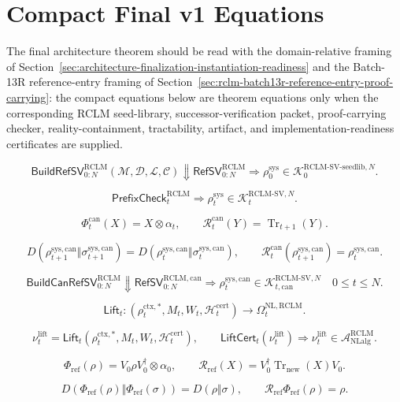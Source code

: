 \documentclass[11pt,a4paper]{article}
\newcommand{\Acal}{\mathcal A}
\newcommand{\Kcal}{\mathcal K}
\newcommand{\Tr}{\operatorname{Tr}}
\newcommand{\RCLM}{\mathrm{RCLM}}
\newcommand{\sys}{\mathrm{sys}}
\newcommand{\ctx}{\mathrm{ctx}}
\newcommand{\cert}{\mathrm{cert}}
\newcommand{\NL}{\mathrm{NL}}
\newcommand{\NLalg}{\mathrm{NLalg}}
\begin{document}
\section{Compact Final v1 Equations}

The final architecture theorem should be read with the domain-relative framing of Section~\ref{sec:architecture-finalization-instantiation-readiness} and the Batch-13R reference-entry framing of Section~\ref{sec:rclm-batch13r-reference-entry-proof-carrying}: the compact equations below are theorem equations only when the corresponding RCLM seed-library, successor-verification packet, proof-carrying checker, reality-containment, tractability, artifact, and implementation-readiness certificates are supplied.

\[
\mathsf{BuildRefSV}_{0:N}^{\RCLM}(\mathcal M,\mathcal D,\mathcal L,\mathcal C)
\Downarrow
\mathsf{RefSV}_{0:N}^{\RCLM}
\Longrightarrow
\rho_0^{\sys}
\in
\Kcal_0^{\RCLM\text{-}\mathrm{SV\mbox{-}seedlib},N}.
\]

\[
\mathsf{PrefixCheck}_t^{\RCLM}
\Longrightarrow
\rho_t^{\sys}
\in
\Kcal_t^{\RCLM\text{-}\mathrm{SV},N}.
\]

\[
\Phi_t^{\mathrm{can}}(X)=X\otimes\alpha_t,
\qquad
\mathcal R_t^{\mathrm{can}}(Y)=\Tr_{t+1}(Y).
\]

\[
D(\rho_{t+1}^{\sys,\mathrm{can}}\Vert\sigma_{t+1}^{\sys,\mathrm{can}})
=
D(\rho_t^{\sys,\mathrm{can}}\Vert\sigma_t^{\sys,\mathrm{can}}),
\qquad
\mathcal R_t^{\mathrm{can}}(\rho_{t+1}^{\sys,\mathrm{can}})=\rho_t^{\sys,\mathrm{can}}.
\]

\[
\mathsf{BuildCanRefSV}_{0:N}^{\RCLM}
\Downarrow
\mathsf{RefSV}_{0:N}^{\RCLM,\mathrm{can}}
\Longrightarrow
\rho_t^{\sys,\mathrm{can}}
\in
\Kcal_{t,\mathrm{can}}^{\RCLM\text{-}\mathrm{SV},N}
\quad 0\le t\le N.
\]

\[
\mathsf{Lift}_t:
(\rho_t^{\ctx,*},M_t,W_t,\mathcal H_t^{\cert})
\to
\Omega_t^{\NL,\RCLM}.
\]

\[
\nu_t^{\mathrm{lift}}=
\mathsf{Lift}_t(\rho_t^{\ctx,*},M_t,W_t,\mathcal H_t^{\cert}),
\qquad
\mathsf{LiftCert}_t(\nu_t^{\mathrm{lift}})
\Rightarrow
\nu_t^{\mathrm{lift}}\in\Acal_{\NLalg}^{\RCLM}.
\]

\[
\Phi_{\mathrm{ref}}(\rho)=V_0\rho V_0^\dagger\otimes\alpha_0,
\qquad
\mathcal R_{\mathrm{ref}}(X)=V_0^\dagger\Tr_{\mathrm{new}}(X)V_0.
\]

\[
D(\Phi_{\mathrm{ref}}(\rho)\Vert\Phi_{\mathrm{ref}}(\sigma))=D(\rho\Vert\sigma),
\qquad
\mathcal R_{\mathrm{ref}}\Phi_{\mathrm{ref}}(\rho)=\rho.
\]
\end{document}
